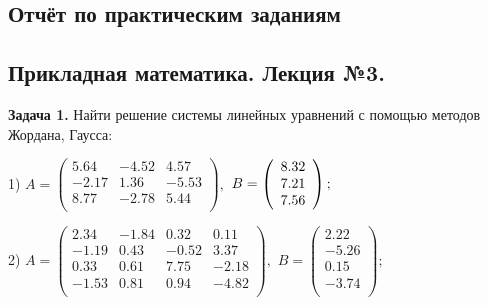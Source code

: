 \documentclass[a4paper, 12pt]{article}
\begin{document}
    \begin{center}
        \subsection*{Отчёт по практическим заданиям}
        \subsection*{Прикладная математика. Лекция №3.}
    \end{center}

    \quad \textbf{Задача 1.} Найти решение системы линейных уравнений с помощью методов Жордана, Гаусса:
    
    \begin{center}

        1) $A = \left(
            \begin{array}{ccc}
                5.64 & -4.52 & 4.57 \\
                -2.17 & 1.36 & -5.53 \\
                8.77 & -2.78 & 5.44 \\
            \end{array}
         \right),$ $B = \left(
            \begin{array}{c}
                8.32 \\
                7.21 \\
                7.56 \\
            \end{array}
         \right);\newline$

         2) $A = \left(
            \begin{array}{cccc}
                2.34 & -1.84 & 0.32 & 0.11 \\
                -1.19 & 0.43 & -0.52 & 3.37 \\
                0.33 & 0.61 & 7.75 & -2.18 \\
                -1.53 & 0.81 & 0.94 & -4.82 \\
            \end{array}
         \right),$ $B = \left(
            \begin{array}{c}
                2.22 \\
                -5.26 \\
                0.15 \\
                -3.74 \\
            \end{array}
         \right);$

    \end{center}
\end{document}
